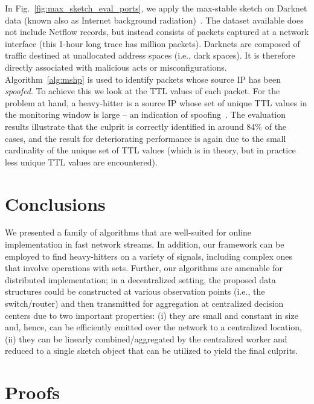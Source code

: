 \documentclass[10pt, conference, letterpaper,onecolumn]{IEEEtranv1.8}
\theoremstyle{plain}\newtheorem{thm}{Theorem}\newtheorem{lem}{Lemma}
\theoremstyle{definition}
\begin{document}
In Fig.~\ref{fig:max_sketch_eval_ports}, we apply the max-stable sketch on Darknet data (known also as Internet background radiation)~\cite{wustrow:2010:radiation}. 
The dataset available does not include Netflow records, but instead consists of  packets captured at a network interface
(this 1-hour long trace  has  million packets). Darknets are composed of traffic destined at unallocated address spaces 
(i.e., dark spaces). It is therefore directly
associated with malicious acts or misconfigurations.  Algorithm~\ref{alg:mshp} is used to identify packets whose source IP has been \emph{spoofed}.
To achieve this we look at the TTL values of each packet. For the problem at hand,  a heavy-hitter is a source IP whose set of unique TTL
values in the monitoring window is large -- an indication of spoofing~\cite{Beverly:2005:SPI:1251282.1251290}. 
The evaluation results illustrate that the culprit is correctly identified in around 84\% of the cases, and the result for deteriorating performance is again due to the small cardinality of the unique set of TTL values (which is  in theory, but
in practice less unique TTL values are encountered).


\section{Conclusions}

 We presented a family of algorithms that are well-suited
 for online implementation in fast network streams. In addition,
 our framework can be employed to find heavy-hitters on
 a variety of signals, including complex ones that involve operations with sets.
 Further, our algorithms are amenable for distributed implementation;
in a decentralized setting, the proposed
 data structures could be constructed at various
observation points (i.e., the switch/router)
and then transmitted for aggregation at centralized decision centers
due to two important properties: (i)  they are small and constant in size and, hence,
can be efficiently emitted over the network to a centralized location, (ii)
they can be linearly combined/aggregated  by the centralized worker and reduced to
a single sketch object that can be utilized to yield the final culprits. 



\appendix



\section{Proofs}
\end{document}
